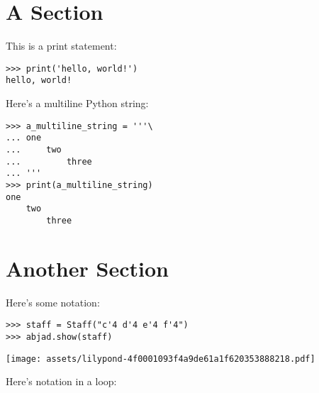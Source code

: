 \documentclass{article}
\begin{document}
\section{A Section}

This is a print statement:

\begin{comment}
<abjad>
print('hello, world!')
</abjad>
\end{comment}

\begin{lstlisting}
>>> print('hello, world!')
hello, world!
\end{lstlisting}

Here's a multiline Python string:

\begin{comment}
<abjad>
a_multiline_string = '''\
one
    two
        three
'''
print(a_multiline_string)
</abjad>
\end{comment}

\begin{lstlisting}
>>> a_multiline_string = '''\
... one
...     two
...         three
... '''
>>> print(a_multiline_string)
one
    two
        three
\end{lstlisting}

\section{Another Section}

Here's some notation:

\begin{comment}
<abjad>
staff = Staff("c'4 d'4 e'4 f'4")
abjad.show(staff)
</abjad>
\end{comment}

\begin{lstlisting}
>>> staff = Staff("c'4 d'4 e'4 f'4")
>>> abjad.show(staff)
\end{lstlisting}
\noindent\texttt{[image: assets/lilypond-4f0001093f4a9de61a1f620353888218.pdf]}

Here's notation in a loop:

\begin{comment}
<abjad>
for leaf in iterate(staff).leaves():
    duration = inspect(leaf).get_duration()
    print(duration)
    abjad.show(leaf)

</abjad>
\end{comment}
\end{document}
